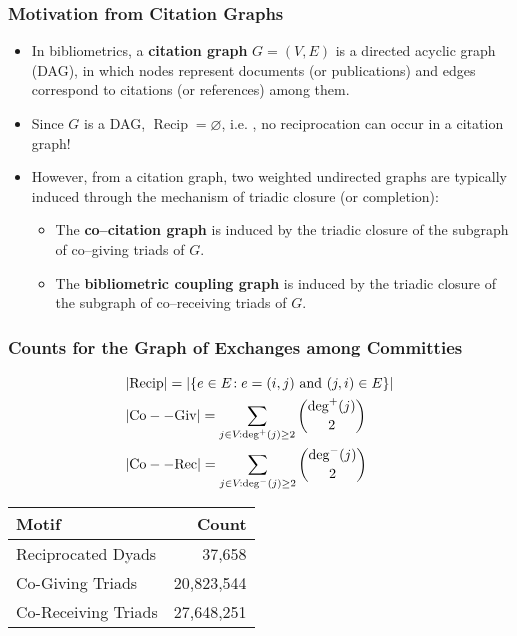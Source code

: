 \documentclass{beamer}
\DeclareMathOperator{\degr}{deg}
\DeclareMathOperator{\rec}{Recip}
\DeclareMathOperator{\cog}{Co--Giv}
\DeclareMathOperator{\cor}{Co--Rec}
\begin{document}
\begin{frame}
\frametitle{Motivation from Citation Graphs}

\begin{itemize}
\item In bibliometrics,  a \alert{{\bf{citation graph}}} $G=(V,E)$ is a directed acyclic graph (\alert{DAG}),  in which nodes represent documents (or publications) and edges correspond to citations (or references) among them.  
\item Since $G$ is a DAG,  \alert{$\rec = \varnothing$},  i.e. \!\!\!,  \alert{no reciprocation} can occur in a citation graph!
\item However,  from a citation graph,  two \alert{weighted undirected graphs} are typically induced through the mechanism of \alert{triadic closure} (or \alert{completion}):
\begin{itemize}
\item The \alert{\bf{co--citation graph}} is induced by the triadic closure of the subgraph of \alert{co--giving triads} of $G$.
\item The \alert{\bf{bibliometric coupling graph}} is induced by the triadic closure of the subgraph of \alert{co--receiving triads} of $G$.

\end{itemize}
\end{itemize}

\end{frame}







\begin{frame}
\frametitle{Counts for the Graph of Exchanges among Committies}
\vspace{-0.5cm}
\begin{align*}
& |\!\rec\!| = |\{e \in E\!: e=(i,j) {\mbox{ and }} (j,i) \in E\}|\\
& |\!\cog\!| = \sum_{j \in V\!: \degr^{+}(j) \geq 2} \dbinom{\degr^{+}(j)}{2}\\
& |\!\cor\!| = \sum_{j \in V\!: \degr^{-}(j) \geq 2} \dbinom{\degr^{-}(j)}{2}
\end{align*}
\vspace{+0.3cm}

\begin{table}[!htb]
\centering
\begin{tabular}{lr}
\toprule
               {\bf{Motif}} &       {\bf{Count}} \\
\midrule
Reciprocated Dyads &     37,658 \\
   Co-Giving Triads & 20,823,544 \\
Co-Receiving Triads & 27,648,251 \\
\bottomrule
\end{tabular}
\end{table}

\end{frame}
\end{document}
